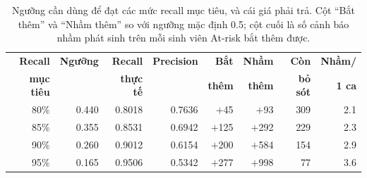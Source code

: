 \begin{table}[H]
  \centering
  \caption{Ngưỡng cần dùng để đạt các mức recall mục tiêu, và cái giá phải trả. Cột ``Bắt thêm'' và ``Nhầm thêm'' so với ngưỡng mặc định 0.5; cột cuối là số cảnh báo nhầm phát sinh trên mỗi sinh viên At-risk bắt thêm được.}
  \label{tab:target_recall}
  \small
  \setlength{\tabcolsep}{5pt}
  \begin{tabular}{rrrrrrrr}
    \toprule
    \textbf{Recall} & \textbf{Ngưỡng} & \textbf{Recall} & \textbf{Precision} & \textbf{Bắt} & \textbf{Nhầm} & \textbf{Còn} & \textbf{Nhầm/} \\
    \textbf{mục tiêu} & & \textbf{thực tế} & & \textbf{thêm} & \textbf{thêm} & \textbf{bỏ sót} & \textbf{1 ca} \\
    \midrule
    80\% & 0.440 & 0.8018 & 0.7636 & $+$45 & $+$93 & 309 & 2.1 \\
    85\% & 0.355 & 0.8531 & 0.6942 & $+$125 & $+$292 & 229 & 2.3 \\
    90\% & 0.260 & 0.9012 & 0.6154 & $+$200 & $+$584 & 154 & 2.9 \\
    95\% & 0.165 & 0.9506 & 0.5342 & $+$277 & $+$998 & 77 & 3.6 \\
    \bottomrule
  \end{tabular}
\end{table}
